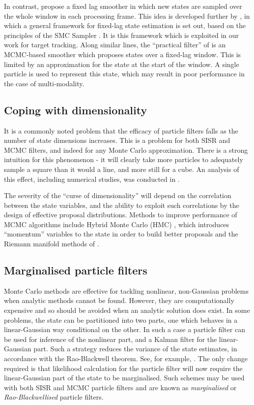 In contrast, \cite{Pitt2001} propose a fixed lag smoother in which new states are sampled over the whole window in each processing frame. This idea is developed further by \cite{Doucet2006}, in which a general framework for fixed-lag state estimation is set out, based on the principles of the SMC Sampler \cite{DelMoral2006}. It is this framework which is exploited in our work for target tracking. Along similar lines, the ``practical filter'' of \cite{Polson2008} is an MCMC-based smoother which proposes states over a fixed-lag window. This is limited by an approximation for the state at the start of the window. A single particle is used to represent this state, which may result in poor performance in the case of multi-modality.



\subsection{Coping with dimensionality}
It is a commonly noted problem that the efficacy of particle filters falls as the number of state dimensions increases. This is a problem for both SISR and MCMC filters, and indeed for any Monte Carlo approximation. There is a strong intuition for this phenomenon - it will clearly take more particles to adequately sample a square than it would a line, and more still for a cube. An analysis of this effect, including numerical studies, was conducted in \cite{Daum2003}.

The severity of the ``curse of dimensionality'' will depend on the correlation between the state variables, and the ability to exploit such correlations by the design of effective proposal distributions. Methods to improve performance of MCMC algorithms include Hybrid Monte Carlo (HMC) \cite{Duane1987}, which introduces ``momentum'' variables to the state in order to build better proposals and the Riemann manifold methods of \cite{Girolami2011}.



\subsection{Marginalised particle filters}
Monte Carlo methods are effective for tackling nonlinear, non-Gaussian problems when analytic methods cannot be found. However, they are computationally expensive and so should be avoided when an analytic solution does exist. In some problems, the state can be partitioned into two parts, one which behaves in a linear-Gaussian way conditional on the other. In such a case a particle filter can be used for inference of the nonlinear part, and a Kalman filter for the linear-Gaussian part. Such a strategy reduces the variance of the state estimates, in accordance with the Rao-Blackwell theorem. See, for example, \cite{Casella1996}. The only change required is that likelihood calculation for the particle filter will now require the linear-Gaussian part of the state to be marginalised. Such schemes may be used with both SISR and MCMC particle filters and are known as \emph{marginalised} or \emph{Rao-Blackwellised} particle filters.


